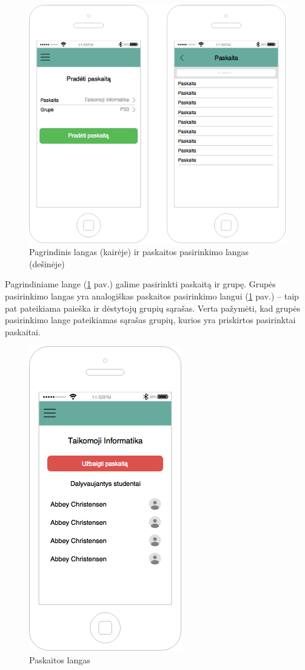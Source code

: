 \documentclass{VUMIFPSkursinis}
\begin{document}
\begin{figure}[H]
	\centering
	\includegraphics[scale=0.5]{img/kursinio_app_dest_main}
	\caption{Pagrindinis langas (kairėje) ir paskaitos pasirinkimo langas (dešinėje)}
	\label{img:scannerMainView}
\end{figure}

Pagrindiniame lange (\ref{img:scannerMainView} pav.) galime pasirinkti paskaitą ir grupę. Grupės pasirinkimo langas yra analogiškas paskaitos pasirinkimo langui (\ref{img:scannerMainView} pav.) – taip pat pateikiama paieška ir dėstytojų grupių sąrašas. Verta pažymėti, kad grupės pasirinkimo lange pateikiamas sąrašas grupių, kurios yra priskirtos pasirinktai paskaitai.

\begin{figure}[H]
	\centering
	\includegraphics[scale=0.5]{img/kursinio_app_dest_lecture}
	\caption{Paskaitos langas}
	\label{img:scannerLectureView}
\end{figure}
\end{document}
